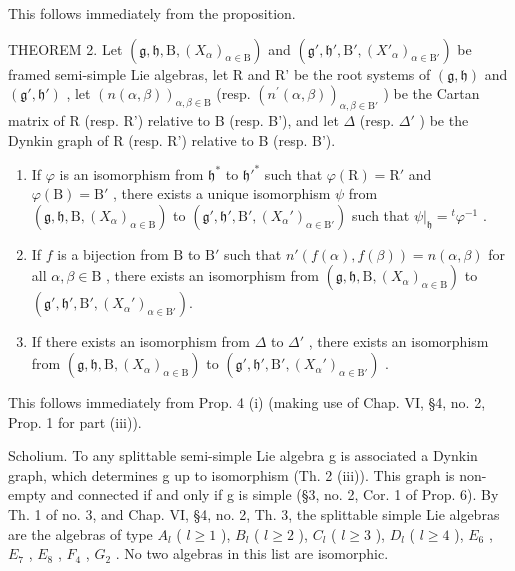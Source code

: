 This follows immediately from the proposition.

THEOREM 2. Let \((\mathfrak{g},\mathfrak{h},\mathrm{B},(X_{\alpha})_{\alpha \in \mathrm{B}})\) and \((\mathfrak{g}',\mathfrak{h}',\mathrm{B}',(X'_{\alpha})_{\alpha \in \mathrm{B}'})\) be framed semi-simple Lie algebras, let R and R' be the root systems of \((\mathfrak{g},\mathfrak{h})\) and \((\mathfrak{g}',\mathfrak{h}')\) , let \((n(\alpha ,\beta))_{\alpha ,\beta \in \mathrm{B}}\) (resp. \((n^{\prime}(\alpha ,\beta))_{\alpha ,\beta \in \mathrm{B}'}\) ) be the Cartan matrix of R (resp. R') relative to B (resp. B'), and let \(\Delta\) (resp. \(\Delta'\) ) be the Dynkin graph of R (resp. R') relative to B (resp. B').

\begin{enumerate}
\def\labelenumi{(\roman{enumi})}
\item
  If \(\varphi\) is an isomorphism from \(\mathfrak{h}^*\) to \(\mathfrak{h}'^*\) such that \(\varphi(\mathrm{R}) = \mathrm{R}'\) and \(\varphi(\mathrm{B}) = \mathrm{B}'\) , there exists a unique isomorphism \(\psi\) from \((\mathfrak{g}, \mathfrak{h}, \mathrm{B}, (X_{\alpha})_{\alpha \in \mathrm{B}})\) to \((\mathfrak{g}', \mathfrak{h}', \mathrm{B}', (X_{\alpha}')_{\alpha \in \mathrm{B}'})\) such that \(\psi|_{\mathfrak{h}} = {}^t\varphi^{-1}\) .
\item
  If \(f\) is a bijection from \(\mathrm{B}\) to \(\mathrm{B}'\) such that \(n'(f(\alpha), f(\beta)) = n(\alpha, \beta)\) for all \(\alpha, \beta \in \mathrm{B}\) , there exists an isomorphism from \((\mathfrak{g}, \mathfrak{h}, \mathrm{B}, (X_{\alpha})_{\alpha \in \mathrm{B}})\) to \((\mathfrak{g}', \mathfrak{h}', \mathrm{B}', (X_{\alpha}')_{\alpha \in \mathrm{B}'}).\)
\item
  If there exists an isomorphism from \(\Delta\) to \(\Delta'\) , there exists an isomorphism from \((\mathfrak{g},\mathfrak{h},\mathrm{B},(X_{\alpha})_{\alpha \in \mathrm{B}})\) to \((\mathfrak{g}',\mathfrak{h}',\mathrm{B}',(X_{\alpha}')_{\alpha \in \mathrm{B}'})\) .
\end{enumerate}

This follows immediately from Prop. 4 (i) (making use of Chap. VI, §4, no. 2, Prop. 1 for part (iii)).

Scholium. To any splittable semi-simple Lie algebra g is associated a Dynkin graph, which determines g up to isomorphism (Th. 2 (iii)). This graph is non-empty and connected if and only if g is simple (§3, no. 2, Cor. 1 of Prop. 6). By Th. 1 of no. 3, and Chap. VI, §4, no. 2, Th. 3, the splittable simple Lie algebras are the algebras of type \(A_{l}\) ( \(l \geq 1\) ), \(B_{l}\) ( \(l \geq 2\) ), \(C_{l}\) ( \(l \geq 3\) ), \(D_{l}\) ( \(l \geq 4\) ), \(E_{6}\) , \(E_{7}\) , \(E_{8}\) , \(F_{4}\) , \(G_{2}\) . No two algebras in this list are isomorphic.

